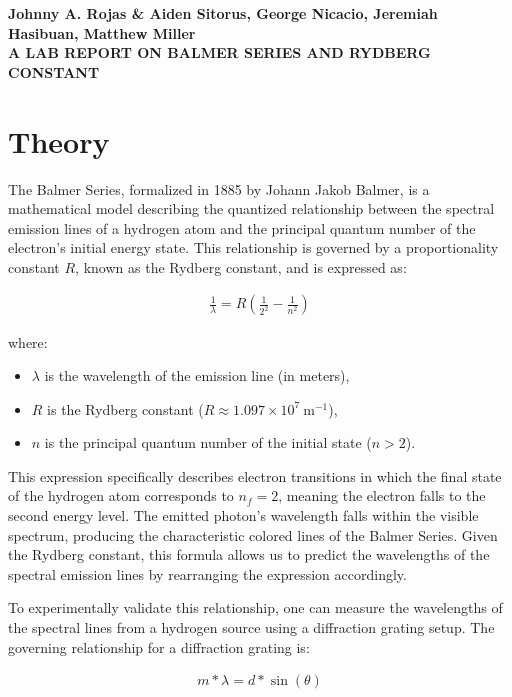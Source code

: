 \documentclass[12pt]{article}
\begin{document}
\begin{center}
    {\textbf{Johnny A. Rojas \& Aiden Sitorus, George Nicacio, Jeremiah
        Hasibuan, Matthew Miller}}\\
    {\Large \textbf{A LAB REPORT ON BALMER SERIES AND RYDBERG CONSTANT}}
\end{center}


\section{Theory}
The Balmer Series, formalized in 1885 by Johann Jakob Balmer, is a mathematical
model describing the quantized relationship between the spectral emission lines of
a hydrogen atom and the principal quantum number of the electron's initial energy
state. This relationship is governed by a proportionality constant $R$, known as
the Rydberg constant, and is expressed as:

\begin{align*}
    \frac{1}{\lambda} = R \left( \frac{1}{2^2} - \frac{1}{n^2} \right)
\end{align*}

where:
\begin{itemize}
    \item $\lambda$ is the wavelength of the emission line (in meters),
    \item $R$ is the Rydberg constant ($R \approx 1.097 \times 10^7 \ \mathrm{m^{-1}}$),
    \item $n$ is the principal quantum number of the initial state ($n > 2$).
\end{itemize}

This expression specifically describes electron transitions in which the final
state of the hydrogen atom corresponds to $n_f = 2$, meaning the electron falls
to the second energy level. The emitted photon's wavelength falls within the
visible spectrum, producing the characteristic colored lines of the Balmer Series.
Given the Rydberg constant, this formula allows us to predict the wavelengths of
the spectral emission lines by rearranging the expression accordingly.

To experimentally validate this relationship, one can measure the wavelengths of
the spectral lines from a hydrogen source using a diffraction grating setup. The
governing relationship for a diffraction grating is:

\begin{align*}
    m * \lambda = d * \sin(\theta)
\end{align*}
\end{document}
